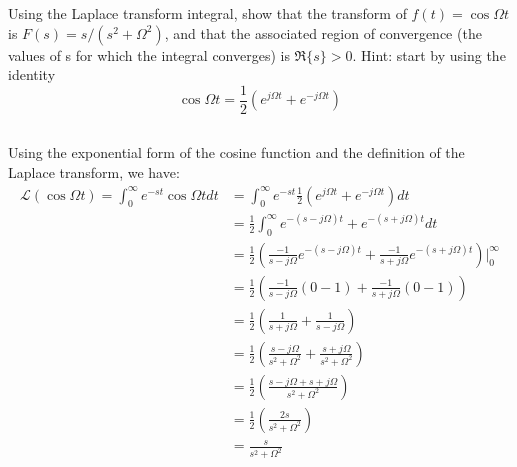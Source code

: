 \section{}

Using the Laplace transform integral, show that the transform of $f(t) = \cos \Omega t$ is
$F(s) = s/(s^2 + \Omega^2)$, and that the associated region of convergence 
(the values of s for which the integral converges) is $\Re\{s\} > 0$. 
Hint: start by using the identity
\[
    \cos \Omega t = \frac{1}{2} \left( e^{j\Omega t} + e^{-j\Omega t} \right)
\]

\subsection{}
Using the exponential form of the cosine function and the definition of the Laplace transform, we have:
\[
\begin{aligned}
    \mathcal{L}(\cos \Omega t) = \int_{0}^{\infty} e^{-st} \cos \Omega t dt &=
    \int_{0}^{\infty} e^{-st} \frac{1}{2} \left( e^{j\Omega t} + e^{-j\Omega t} \right) dt \\
    &= \frac{1}{2} \int_{0}^{\infty} e^{-(s-j\Omega)t} + e^{-(s+j\Omega)t} dt \\
    &= \frac{1}{2} \left( \frac{-1}{s-j\Omega} e^{-(s-j\Omega)t} + \frac{-1}{s+j\Omega} e^{-(s+j\Omega)t} \right) \bigg|_{0}^{\infty} \\
    &= \frac{1}{2} \left( \frac{-1}{s-j\Omega} \left( 0 - 1 \right) + \frac{-1}{s+j\Omega} \left( 0 - 1 \right) \right) \\
    &= \frac{1}{2} \left( \frac{1}{s+j\Omega} + \frac{1}{s-j\Omega} \right) \\
    &= \frac{1}{2} \left( \frac{s-j\Omega}{s^2 + \Omega^2} + \frac{s+j\Omega}{s^2 + \Omega^2} \right) \\
    &= \frac{1}{2} \left( \frac{s-j\Omega + s+j\Omega}{s^2 + \Omega^2} \right) \\
    &= \frac{1}{2} \left( \frac{2s}{s^2 + \Omega^2} \right) \\
    &= \frac{s}{s^2 + \Omega^2}
\end{aligned}
\]
